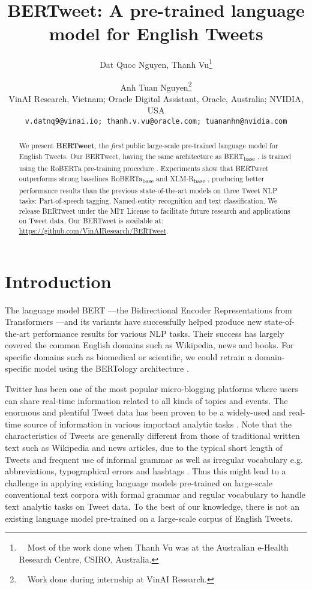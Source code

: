\documentclass[11pt,a4paper]{article}
\title{BERTweet: A pre-trained language model for English Tweets}
\author{Dat Quoc Nguyen, Thanh Vu\thanks{\ \ Most of the work done
when Thanh Vu was at the Australian e-Health Research Centre, CSIRO, Australia. }   \and Anh Tuan Nguyen\thanks{\ \ Work done during internship at  VinAI Research.} \\
  VinAI Research, Vietnam; Oracle Digital Assistant, Oracle, Australia; NVIDIA, USA\\
   \tt{\normalsize v.datnq9@vinai.io; thanh.v.vu@oracle.com; tuananhn@nvidia.com}}
\date{}
\begin{document}
\maketitle
\begin{abstract}
We present \textbf{BERTweet}, the \emph{first} public large-scale pre-trained language model  for English Tweets. Our BERTweet, having the same architecture as BERT\textsubscript{base} \citep{devlin-etal-2019-bert}, is trained using the RoBERTa pre-training procedure \citep{RoBERTa}. 
Experiments show that BERTweet outperforms strong baselines RoBERTa\textsubscript{base} and XLM-R\textsubscript{base} \citep{conneau2019unsupervised}, producing better performance results than the previous state-of-the-art models on three Tweet NLP tasks: Part-of-speech tagging, Named-entity recognition and text classification. We release BERTweet under the MIT License to facilitate future research and  applications on Tweet data. Our BERTweet is available at: \url{https://github.com/VinAIResearch/BERTweet}.
\end{abstract}






\section{Introduction}\label{sec:intro}


The language model BERT \citep{devlin-etal-2019-bert}---the Bidirectional Encoder Representations from Transformers \citep{NIPS2017_7181}---and its variants 
have successfully helped produce new state-of-the-art performance results for various NLP tasks. Their success has largely covered the common English domains such as Wikipedia, news and books. For specific domains such as biomedical or scientific, we could retrain a domain-specific model using the BERTology architecture \cite{beltagy-etal-2019-scibert,btz682,dontstoppretraining2020}.

Twitter has been one of the most popular micro-blogging platforms where users can share real-time information related to all kinds of topics and events. The enormous and plentiful Tweet data has been proven to be a widely-used and real-time source of information in various important analytic tasks \cite{GhaniHHA19}. 
Note that the characteristics of Tweets are generally different from those of traditional written text such as Wikipedia and news articles, due to the typical short length of Tweets and frequent use of informal grammar as well as irregular vocabulary e.g. abbreviations, typographical errors and hashtags \citep{eisenstein-2013-bad,2414425.2414430}. Thus this might lead to a challenge in applying existing language models pre-trained on large-scale conventional text corpora with formal grammar and regular vocabulary to handle text analytic tasks on Tweet data. To the best of our knowledge, there is not an existing language model pre-trained on a large-scale corpus of English Tweets. 
\end{document}

